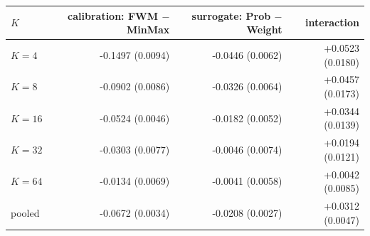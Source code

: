 \begin{tabular}{lrrr}
\toprule
$K$ & calibration: FWM $-$ MinMax & surrogate: Prob $-$ Weight & interaction \\
\midrule
$K{=}4$ & -0.1497 (0.0094) & -0.0446 (0.0062) & +0.0523 (0.0180) \\
$K{=}8$ & -0.0902 (0.0086) & -0.0326 (0.0064) & +0.0457 (0.0173) \\
$K{=}16$ & -0.0524 (0.0046) & -0.0182 (0.0052) & +0.0344 (0.0139) \\
$K{=}32$ & -0.0303 (0.0077) & -0.0046 (0.0074) & +0.0194 (0.0121) \\
$K{=}64$ & -0.0134 (0.0069) & -0.0041 (0.0058) & +0.0042 (0.0085) \\
pooled & -0.0672 (0.0034) & -0.0208 (0.0027) & +0.0312 (0.0047) \\
\bottomrule
\end{tabular}
